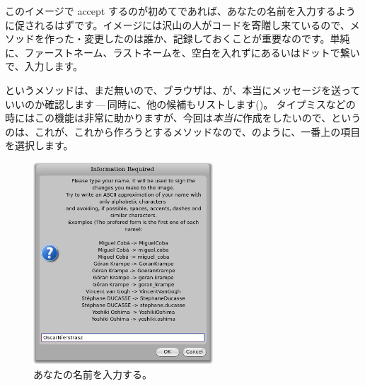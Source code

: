 \documentclass[a4paper,10pt,twoside]{book}
\begin{document}
このイメージで accept するのが初めてであれば、あなたの名前を入力するように促されるはずです。イメージには沢山の人がコードを寄贈し来ているので、メソッドを作った・変更したのは誰か、記録しておくことが重要なのです。単純に、ファーストネーム、ラストネームを、空白を入れずにあるいはドットで繋いで、入力します。


というメソッドは、まだ無いので、ブラウザは、が、本当にメッセージを送っていいのか確認します\,---\,同時に、他の候補もリストします()。
タイプミスなどの時にはこの機能は非常に助かりますが、今回は\emph{本当に}作成をしたいので、というのは、これが、これから作ろうとするメソッドなので、のように、一番上の項目を選択します。



\begin{figure}[htb]
\centerline {\includegraphics[width=0.6\textwidth]{name}}
\caption{あなたの名前を入力する。}
\end{figure}
\end{document}
